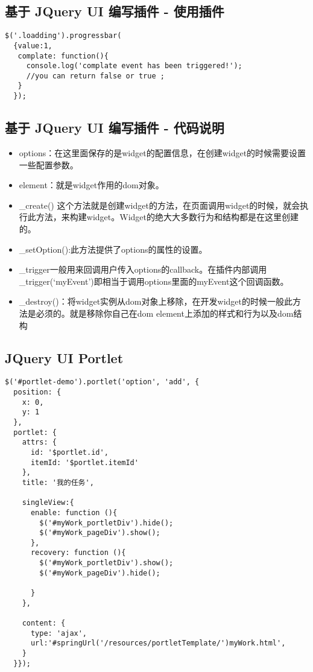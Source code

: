 \documentclass[11pt]{article}
\begin{document}
\subsection*{基于 JQuery UI 编写插件 - 使用插件}
\label{sec-1-3}

\begin{verbatim}
$('.loadding').progressbar(
  {value:1,
   complate: function(){
     console.log('complate event has been triggered!');
     //you can return false or true ;
   }
  });
\end{verbatim}

\subsection*{基于 JQuery UI 编写插件 - 代码说明}
\label{sec-1-4}
\begin{itemize}
\item options：在这里面保存的是widget的配置信息，在创建widget的时候需要设置一些配置参数。
\item element：就是widget作用的dom对象。
\item \_create() 这个方法就是创建widget的方法，在页面调用widget的时候，就会执行此方法，来构建widget。Widget的绝大大多数行为和结构都是在这里创建的。
\item \_setOption():此方法提供了options的属性的设置。
\item \_trigger一般用来回调用户传入options的callback。在插件内部调用\_trigger(‘myEvent’)即相当于调用options里面的myEvent这个回调函数。
\item \_destroy()：将widget实例从dom对象上移除，在开发widget的时候一般此方法是必须的。就是移除你自己在dom element上添加的样式和行为以及dom结构
\end{itemize}
\subsection*{JQuery UI Portlet}
\label{sec-1-5}

\begin{verbatim}
$('#portlet-demo').portlet('option', 'add', {
  position: {
    x: 0,
    y: 1
  },
  portlet: {
    attrs: {
      id: '$portlet.id',
      itemId: '$portlet.itemId'
    },
    title: '我的任务',

    singleView:{
      enable: function (){
        $('#myWork_portletDiv').hide();
        $('#myWork_pageDiv').show();
      },
      recovery: function (){
        $('#myWork_portletDiv').show();
        $('#myWork_pageDiv').hide();

      }
    },

    content: {
      type: 'ajax',
      url:'#springUrl('/resources/portletTemplate/')myWork.html',
    }
  }});
\end{verbatim}
\end{document}
